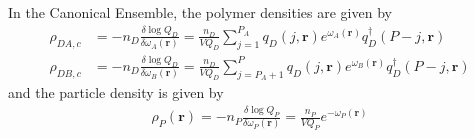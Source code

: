 \documentclass{article}
\begin{document}
  In the Canonical Ensemble, the polymer densities are given by
  \begin{align*}
    \rho_{DA,c} &=
      -n_D \frac{\delta \log Q_D}{\delta \omega_A(\mathbf{r})}
      = \frac{n_D}{V Q_D}
      \sum_{j=1}^{P_A}
      q_D(j, \mathbf{r})
      e^{\omega_A(\mathbf{r})}
      q_D^\dagger(P-j, \mathbf{r}) \\
    \rho_{DB,c} &=
      -n_D \frac{\delta \log Q_D}{\delta \omega_B(\mathbf{r})}
      = \frac{n_D}{V Q_D}
      \sum_{j=P_A+1}^{P}
      q_D(j, \mathbf{r})
      e^ {\omega_B(\mathbf{r})}
      q_D^\dagger(P-j, \mathbf{r})
  \end{align*}
  and the particle density is given by
  \begin{align*}
    \rho_P(\mathbf{r}) =
      -n_P \frac{\delta \log Q_P}{\delta \omega_P(\mathbf{r})}
      = \frac{n_P}{V Q_P} e^{-\omega_P(\mathbf{r})}
  \end{align*}
  
  
  
  
\end{document}
